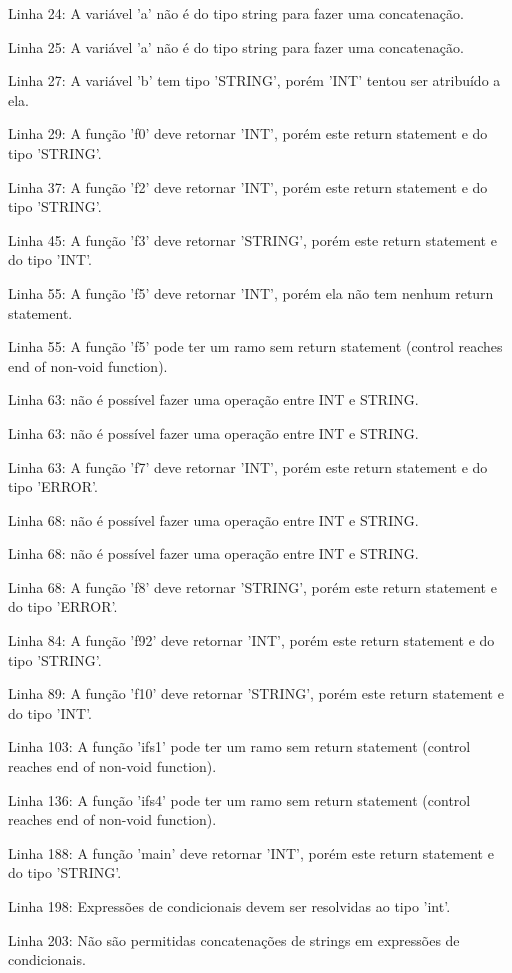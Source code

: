 \documentclass[12pt]{article}
\begin{document}
Linha 24: A variável 'a' não é do tipo string para fazer uma concatenação.

Linha 25: A variável 'a' não é do tipo string para fazer uma concatenação.

Linha 27: A variável 'b' tem tipo 'STRING', porém 'INT' tentou ser atribuído a ela.

Linha 29: A função 'f0' deve retornar 'INT', porém este return statement e do tipo 'STRING'.

Linha 37: A função 'f2' deve retornar 'INT', porém este return statement e do tipo 'STRING'.

Linha 45: A função 'f3' deve retornar 'STRING', porém este return statement e do tipo 'INT'.

Linha 55: A função 'f5' deve retornar 'INT', porém ela não tem nenhum return statement.

Linha 55: A função 'f5' pode ter um ramo sem return statement (control reaches end of non-void function).

Linha 63: não é possível fazer uma operação entre INT e STRING.

Linha 63: não é possível fazer uma operação entre INT e STRING.

Linha 63: A função 'f7' deve retornar 'INT', porém este return statement e do tipo 'ERROR'.

Linha 68: não é possível fazer uma operação entre INT e STRING.

Linha 68: não é possível fazer uma operação entre INT e STRING.

Linha 68: A função 'f8' deve retornar 'STRING', porém este return statement e do tipo 'ERROR'.

Linha 84: A função 'f92' deve retornar 'INT', porém este return statement e do tipo 'STRING'.

Linha 89: A função 'f10' deve retornar 'STRING', porém este return statement e do tipo 'INT'.

Linha 103: A função 'ifs1' pode ter um ramo sem return statement (control reaches end of non-void function).

Linha 136: A função 'ifs4' pode ter um ramo sem return statement (control reaches end of non-void function).

Linha 188: A função 'main' deve retornar 'INT', porém este return statement e do tipo 'STRING'.

Linha 198: Expressões de condicionais devem ser resolvidas ao tipo 'int'.

Linha 203: Não são permitidas concatenações de strings em expressões de condicionais.
\end{document}
